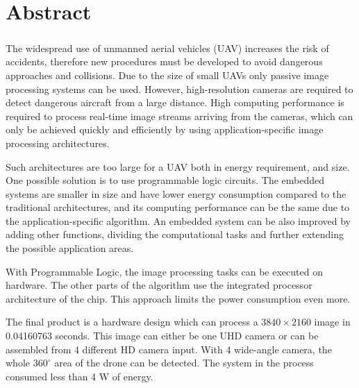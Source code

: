 \chapter*{Abstract}
\paragraph{}
The widespread use of unmanned aerial vehicles (UAV) increases the risk of accidents, therefore new procedures must be developed to avoid dangerous approaches and collisions. Due to the size of small UAVs only passive image processing systems can be used. However, high-resolution cameras are required to detect dangerous aircraft from a large distance. High computing performance is required to process real-time image streams arriving from the cameras, which can only be achieved quickly and efficiently by using application-specific image processing architectures.

Such architectures are too large for a UAV both in energy requirement, and size.
One possible solution is to use programmable logic circuits.
The embedded systems are smaller in size and have lower energy consumption compared to the traditional architectures, and its computing performance can be the same due to the application-specific algorithm. 
An embedded system can be also improved by adding other functions, dividing the computational tasks and further extending the possible application areas.

With Programmable Logic, the image processing tasks can be executed on hardware.
The other parts of the algorithm use the integrated processor architecture of the chip.
This approach limits the power consumption even more.

The final product is a hardware design which can process a $3840 \times 2160$ image in 0.04160763 seconds.
This image can either be one UHD camera or can be assembled from 4 different HD camera input.
With 4 wide-angle camera, the whole $360^\circ$ area of the drone can be detected.
The system in the process consumed less than 4 W of energy.

\clearpage